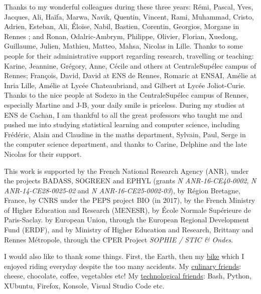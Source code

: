 \begin{acknowledgements}
Thanks to my wonderful colleagues during these three years: Rémi, Pascal, Yves, Jacques, Ali, Haïfa, Marwa, Navik, Quentin, Vincent, Rami, Muhammad, Cristo, Adrien, Esteban, Ali, Éloïse, Nabil, Bastien, Corentin, Georgios, Morgane in Rennes ; and Ronan, Odalric-Ambrym, Philippe, Olivier, Florian, Xuedong, Guillaume, Julien, Mathieu, Matteo, Mahsa, Nicolas in Lille.
%
Thanks to some people for their administrative support regarding research, travelling or teaching: Karine, Jeannine, Grégory, Anne, Cécile and others at CentraleSupélec campus of Rennes; François, David, David at ENS de Rennes, Romaric at ENSAI, Amélie at Inria Lille, Amélie at Lycée Chateaubriand, and Gilbert at Lycée Joliot-Curie.
Thanks to the nice people at Sodexo in the CentraleSupélec campus of Rennes, especially Martine and J-B, your daily smile is priceless.
%
During my studies at ENS de Cachan, I am thankful to all the great professors who taught me and pushed me into studying statistical learning and computer science, including Frédéric, Alain and Claudine in the maths department, Sylvain, Paul, Serge in the computer science department, and thanks to Carine, Delphine and the late Nicolas for their support.


This work is supported by
the French National Research Agency (ANR), under the projects BADASS, SOGREEN and EPHYL (grants \emph{N ANR-16-CE40-0002}, \emph{N ANR-14-CE28-0025-02} and \emph{N ANR-16-CE25-0002-03}),
by R\'egion Bretagne, France,
by CNRS under the PEPS project BIO (in $2017$),
by the French Ministry of Higher Education and Research (MENESR),
by \'Ecole Normale Sup\'erieure de Paris-Saclay.
by European Union, through the European Regional Development Fund (ERDF),
and by Ministry of Higher Education and Research, Brittany and Rennes Métropole, through the CPER Project \emph{SOPHIE / STIC \& Ondes}.


I would also like to thank some things. First, the Earth, then my \href{https://perso.crans.org/besson/zero-dechet/}{bike} which I enjoyed riding everyday despite the too many accidents.
My \href{https://perso.crans.org/besson/cuisine/}{culinary friends}: cheese, chocolate, coffee, vegetables etc!
My \href{https://perso.crans.org/besson/}{technological friends}: Bash, Python, XUbuntu, Firefox, Konsole, Visual Studio Code etc.



\end{acknowledgements}
